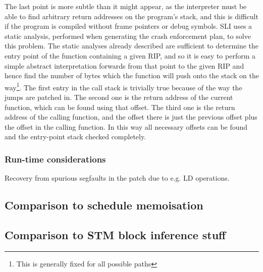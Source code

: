 The last point is more subtle than it might appear, as the interpreter must be able to find arbitrary return addresses on the program's stack, and this is difficult if the program is compiled without frame pointers or debug symbols.
SLI uses a static analysis, performed when generating the crash enforcement plan, to solve this problem.
The static analyses already described are sufficient to determine the entry point of the function containing a given RIP, and so it is easy to perform a simple abstract interpretation forwards from that point to the given RIP and hence find the number of bytes which the function will push onto the stack on the way\footnote{This is generally fixed for all possible paths}.
The first entry in the call stack is trivially true because of the way the jumps are patched in.
The second one is the return address of the current function, which can be found using that offset.
The third one is the return address of the calling function, and the offset there is just the previous offset plus the offset in the calling function.
In this way all necessary offsets can be found and the entry-point stack checked completely.

\subsubsection{Run-time considerations}

Recovery from spurious segfaults in the patch due to e.g. LD operations.

\subsection{Comparison to schedule memoisation}
\subsection{Comparison to STM block inference stuff}

